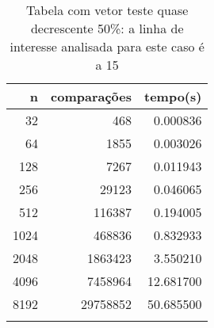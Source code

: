 \begin{table}[ht]
\centering
\begin{tabular}{rrr} \toprule
        n &    comparações &       tempo(s) \\ \midrule
      32  &            468 &      0.000836 \\
      64  &           1855 &      0.003026 \\
     128  &           7267 &      0.011943 \\
     256  &          29123 &      0.046065 \\
     512  &         116387 &      0.194005 \\
    1024  &         468836 &      0.832933 \\
    2048  &        1863423 &      3.550210 \\
    4096  &        7458964 &     12.681700 \\
    8192  &       29758852 &     50.685500 \\
\bottomrule\addlinespace
\end{tabular}
\caption{Tabela com vetor teste quase decrescente 50\%: a linha de interesse analisada para este caso é a 15}
\label{tab:insertionsortQuaseDecresc50}
\end{table}
